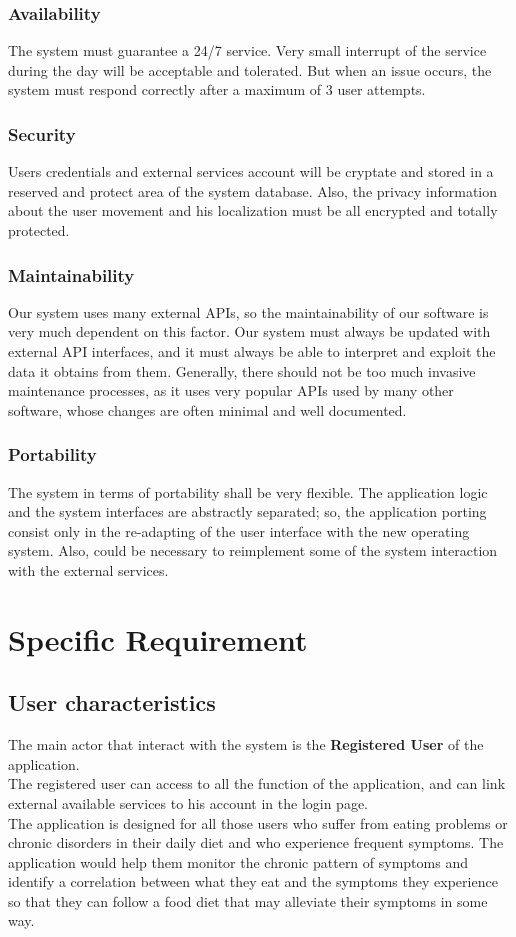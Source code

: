 \documentclass [12pt]{article}
\begin{document}
\subsubsection{Availability}
The system must guarantee a 24/7 service. Very small interrupt of the service during the day will be acceptable and tolerated. But when an issue occurs, the system must respond correctly after a maximum of 3 user attempts.
\subsubsection{Security}
Users credentials and external services account will be cryptate and stored in a reserved and protect area of the system database. Also, the privacy information about the user movement and his localization must be all encrypted and totally protected.
\subsubsection{Maintainability}
Our system uses many external APIs, so the maintainability of our software is very much dependent on this factor. Our system must always be updated with external API interfaces, and it must always be able to interpret and exploit the data it obtains from them.
Generally, there should not be too much invasive maintenance processes, as it uses very popular APIs used by many other software, whose changes are often minimal and well documented.
\subsubsection{Portability}
The system in terms of portability shall be very flexible. The application logic and the system interfaces are abstractly separated; so, the application porting consist only in the re-adapting of the user interface with the new operating system.
Also, could be necessary to reimplement some of the system interaction with the external services.\\

\section{Specific Requirement}
\subsection{User characteristics}
The main actor that interact with the system is the \textbf{Registered User} of the application.\\
The registered user can access to all the function of the application, and can link external available services to his account in the login page.\\
The application is designed for all those users who suffer from eating problems or chronic disorders in their daily diet and who experience frequent symptoms. The application would help them monitor the chronic pattern of symptoms and identify a correlation between what they eat and the symptoms they experience so that they can follow a food diet that may alleviate their symptoms in some way. 
\end{document}
